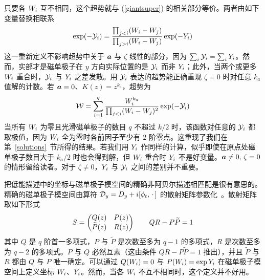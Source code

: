 只要各 $\sW_i$ 互不相同，这个超势就与 (\ref{giantsuper}) 的相关部分等价。两者由如下变量替换相联系
\begin{equation} \label{rela}
\exp(-\nY_i) = \frac{\prod_{j<i} (\sW_i - \sW_j)}{\prod_{j>i} (\sW_i - \sW_j)} \exp(-\sY_i)
\end{equation}
这一重新定义不影响超势中关于 $\ca$ 与 $\zeta$ 线性的部分，因为 $\sum_i \nY_i = \sum_i \sY_i$。然而，实部才是磁单极子在 $y$ 方向实际位置的是 $\nY_i$ 而非 $\sY_i$；此外，当两个或更多 $\sW_i$ 重合时，$\nY_i$ 与 $\sY_i$ 之差发散。用 $\nY_i$ 表达的超势能正确重现 $\zeta =0$ 时对任意 $k_a$ 值解的计数。若 $\ca=0$、$K(z) = z^{k_a}$，超势为
\begin{equation}
\W=\sum_{i=1}^q \frac{\sW_i^{k_a}}{\prod_{j<i} (\sW_i - \sW_j)^2}\exp(-\nY_i)
\end{equation}
当所有 $\sW_i$ 为零且光滑磁单极子的数目 $q$ 不超过 $k/2$ 时，该函数对任意的 $\nY_i$ 都取极值，因为 $\sW_i$ 全为零时各前因子至少有 $2$ 阶零点。这重现了我们在第~\ref{solutions}~节所得的结果。若我们用 $\sY_i$ 作同样的计算，似乎即使在原点处磁单极子数目大于 $k_a/2$ 时也会得到解，但 $\sW_i$ 重合时 $\sY_i$ 不是好变量。$\ca\not=0,\,\zeta=0$ 的情形留给读者。对于 $\zeta\not=0$，$\sY_i$ 与 $\nY_i$ 之间的差别并不重要。


把低能描述中的坐标与磁单极子模空间的精确非阿贝尔描述相匹配是很有意思的。精确的磁单极子模空间由算符 $\D_y=D_y+i[\phi_t,\,\cdot\,]$ 的散射矩阵参数化~\cite{Hurtubise}。散射矩阵取如下形式
\begin{equation}
S = \begin{pmatrix} Q(z) & P(z) \cr \tilde P(z) & R(z)\end{pmatrix} \qquad QR - P \tilde P =1
\end{equation}
其中 $Q$ 是 $q$ 阶首一多项式，$P$ 与 $\tilde P$ 是次数至多为 $q-1$ 的多项式，$R$ 是次数至多为 $q-2$ 的多项式。$P$ 与 $Q$ 必然互素（这由条件 $QR-P\tilde P=1$ 推出），并且 $\tilde P$ 与 $R$ 都由 $Q$ 与 $P$ 唯一确定。可以通过 $Q(\sW_i)=0$ 与 $P(\sW_i) = \exp \sY_i$ 在磁单极子模空间上定义坐标 $\sW_i$、$\sY_i$。然而，当各 $\sW_i$ 不互不相同时，这个定义并不好用。


